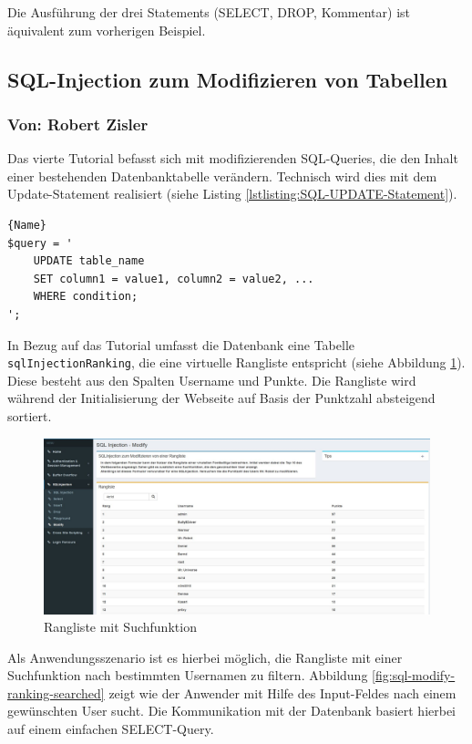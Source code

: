 Die Ausführung der drei Statements (SELECT, DROP, Kommentar) ist äquivalent zum vorherigen Beispiel.

\subsection{SQL-Injection zum Modifizieren von Tabellen}
\subsubsection*{Von: Robert Zisler}
Das vierte Tutorial befasst sich mit modifizierenden SQL-Queries, die den Inhalt einer bestehenden Datenbanktabelle verändern. Technisch wird dies mit dem Update-Statement realisiert (siehe Listing \ref{lstlisting:SQL-UPDATE-Statement}).

\begin{lstlisting}[caption=SQL-UPDATE-Statement\label{lstlisting:SQL-UPDATE-Statement}]{Name}
$query = '
	UPDATE table_name
	SET column1 = value1, column2 = value2, ...
	WHERE condition; 
';
\end{lstlisting}
In Bezug auf das Tutorial umfasst die Datenbank eine Tabelle \colorbox{altgray}{\lstinline|sqlInjectionRanking|}, die eine virtuelle Rangliste entspricht (siehe Abbildung \ref{fig:sql-modify-ranking}). Diese besteht aus den Spalten Username und Punkte. Die Rangliste wird während der Initialisierung der Webseite auf Basis der Punktzahl absteigend sortiert.

\begin{figure}[H]
	\centering
	\includegraphics[width=\textwidth]{images/SQL_Injection/sql_modify.jpg}
	\caption{Rangliste mit Suchfunktion}
	\label{fig:sql-modify-ranking}
\end{figure}

Als Anwendungsszenario ist es hierbei möglich, die Rangliste mit einer Suchfunktion nach bestimmten Usernamen zu filtern. Abbildung \ref{fig:sql-modify-ranking-searched} zeigt wie der Anwender mit Hilfe des Input-Feldes nach einem gewünschten User sucht. Die Kommunikation mit der Datenbank basiert hierbei auf einem einfachen SELECT-Query.

